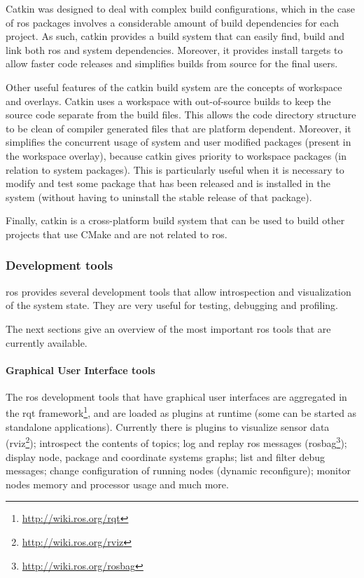 Catkin was designed to deal with complex build configurations, which in the case of \gls{ros} packages involves a considerable amount of build dependencies for each project. As such, catkin provides a build system that can easily find, build and link both \gls{ros} and system dependencies. Moreover, it provides install targets to allow faster code releases and simplifies builds from source for the final users.

Other useful features of the catkin build system are the concepts of workspace and overlays. Catkin uses a workspace with out-of-source builds to keep the source code separate from the build files. This allows the code directory structure to be clean of compiler generated files that are platform dependent. Moreover, it simplifies the concurrent usage of system and user modified packages (present in the workspace overlay), because catkin gives priority to workspace packages (in relation to system packages). This is particularly useful when it is necessary to modify and test some package that has been released and is installed in the system (without having to uninstall the stable release of that package).

Finally, catkin is a cross-platform build system that can be used to build other projects that use CMake and are not related to \gls{ros}.


\subsubsection{Development tools}

\gls{ros} provides several development tools that allow introspection and visualization of the system state. They are very useful for testing, debugging and profiling.

The next sections give an overview of the most important \gls{ros} tools that are currently available.


\paragraph{Graphical User Interface tools}

The \gls{ros} development tools that have graphical user interfaces are aggregated in the rqt framework\footnote{\url{http://wiki.ros.org/rqt}}, and are loaded as plugins at runtime (some can be started as standalone applications). Currently there is plugins to visualize sensor data (rviz\footnote{\url{http://wiki.ros.org/rviz}}); introspect the contents of topics; log and replay \gls{ros} messages (rosbag\footnote{\url{http://wiki.ros.org/rosbag}}); display node, package and coordinate systems graphs; list and filter debug messages; change configuration of running nodes (dynamic reconfigure); monitor nodes memory and processor usage and much more.


